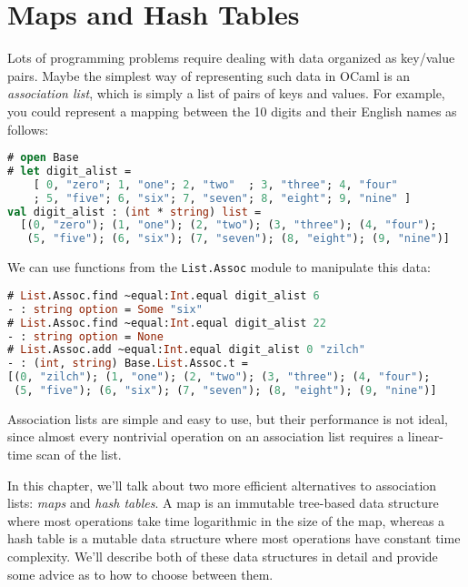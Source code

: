 \hypertarget{maps-and-hash-tables}{%
\section{Maps and Hash Tables}\label{maps-and-hash-tables}}

Lots of programming problems require dealing with data organized as
key/value pairs. Maybe the simplest way of representing such data in
OCaml is an \emph{association list}, which is simply a list of pairs of
keys and values. For example, you could represent a mapping between the
10 digits and their English names as follows:

\begin{lstlisting}[language=Caml]
# open Base
# let digit_alist =
    [ 0, "zero"; 1, "one"; 2, "two"  ; 3, "three"; 4, "four"
    ; 5, "five"; 6, "six"; 7, "seven"; 8, "eight"; 9, "nine" ]
val digit_alist : (int * string) list =
  [(0, "zero"); (1, "one"); (2, "two"); (3, "three"); (4, "four");
   (5, "five"); (6, "six"); (7, "seven"); (8, "eight"); (9, "nine")]
\end{lstlisting}

We can use functions from the \passthrough{\lstinline!List.Assoc!}
module to manipulate this data:

\begin{lstlisting}[language=Caml]
# List.Assoc.find ~equal:Int.equal digit_alist 6
- : string option = Some "six"
# List.Assoc.find ~equal:Int.equal digit_alist 22
- : string option = None
# List.Assoc.add ~equal:Int.equal digit_alist 0 "zilch"
- : (int, string) Base.List.Assoc.t =
[(0, "zilch"); (1, "one"); (2, "two"); (3, "three"); (4, "four");
 (5, "five"); (6, "six"); (7, "seven"); (8, "eight"); (9, "nine")]
\end{lstlisting}

Association lists are simple and easy to use, but their performance is
not ideal, since almost every nontrivial operation on an association
list requires a linear-time scan of the list.

In this chapter, we'll talk about two more efficient alternatives to
association lists: \emph{maps} and \emph{hash tables}. A map is an
immutable tree-based data structure where most operations take time
logarithmic in the size of the map, whereas a hash table is a mutable
data structure where most operations have constant time complexity.
We'll describe both of these data structures in detail and provide some
advice as to how to choose between them. 

